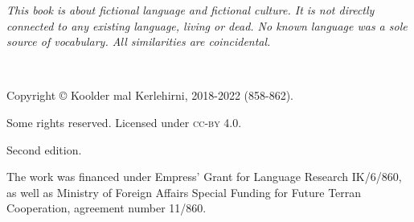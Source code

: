 \emph{This book is about fictional language and fictional culture. It is not
directly connected to any existing language, living or dead. No known language
was a sole source of vocabulary. All similarities are coincidental.}

~\vfill

\begingroup
\setlength\parindent{0pt}\footnotesize
Copyright © Koolder mal Kerlehirni, 2018-2022 (858-862).

\bigskip

Some rights reserved. Licensed under \textsc{cc-by} 4.0.

Second edition.

\medskip

The work was financed under Empress' Grant for Language Research IK/6/860,
as well as Ministry of Foreign Affairs Special Funding for Future Terran
Cooperation, agreement number 11/860.

\endgroup